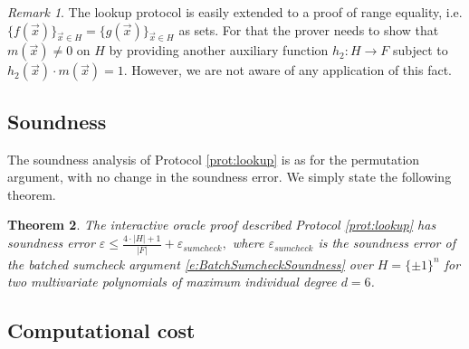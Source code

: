 \documentclass[11pt]{article}
\newtheorem{thm}{Theorem}[]
\theoremstyle{definition}
\theoremstyle{remark}
\newtheorem{rem}[thm]{Remark}
\begin{document}
\begin{rem}
The lookup protocol is easily extended to a proof of range equality, i.e. $\{f(\vec x)\}_{\vec x\in H} = \{g(\vec x)\}_{\vec x\in H}$ as sets.
For that the prover needs to show that $m(\vec x)\neq 0$ on $H$ by providing another auxiliary function $h_2: H\rightarrow F$ subject to $h_2(\vec x)\cdot m(\vec x) = 1$.
However, we are not aware of any application of this fact.
\end{rem}

\subsection{Soundness}
The soundness analysis of Protocol \ref{prot:lookup} is as for the permutation argument, with no change in the soundness error. 
We simply state the following theorem.
\begin{thm}
\label{thm:lookup:soundness}
 The interactive oracle proof described Protocol \ref{prot:lookup} has soundness error
$
\varepsilon \leq \frac{4\cdot |H| + 1}{|F|} + \varepsilon_{sumcheck},
$
where $\varepsilon_{sumcheck}$ is the soundness error of the batched sumcheck argument \eqref{e:BatchSumcheckSoundness} over $H=\{\pm 1\}^n$ for two multivariate polynomials of maximum individual degree $d = 6$.
\end{thm}

\subsection{Computational cost}
\end{document}
